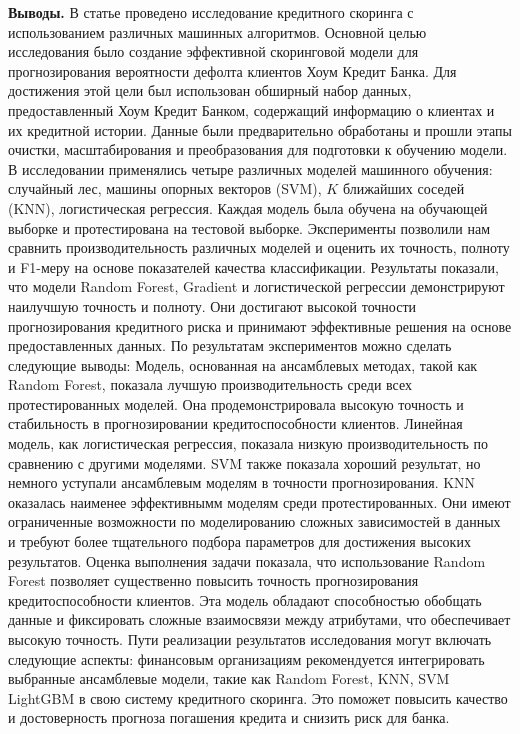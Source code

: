 {\bfseries Выводы.} В статье проведено исследование кредитного скоринга с
использованием различных машинных алгоритмов. Основной целью
исследования было создание эффективной скоринговой модели для
прогнозирования вероятности дефолта клиентов Хоум Кредит Банка. Для
достижения этой цели был использован обширный набор данных,
предоставленный Хоум Кредит Банком, содержащий информацию о клиентах и
\hspace{0pt}\hspace{0pt}их кредитной истории. Данные были предварительно
обработаны и прошли этапы очистки, масштабирования и преобразования для
подготовки к обучению модели. В исследовании применялись четыре
различных моделей машинного обучения: случайный лес, машины опорных
векторов (SVM), $K$ ближайших соседей
(KNN), логистическая регрессия. Каждая модель была обучена на обучающей
выборке и протестирована на тестовой выборке. Эксперименты позволили нам
сравнить производительность различных моделей и оценить их точность,
полноту и F1-меру на основе показателей качества классификации.
Результаты показали, что модели Random Forest, Gradient и логистической
регрессии демонстрируют наилучшую точность и полноту. Они достигают
высокой точности прогнозирования кредитного риска и принимают
эффективные решения на основе предоставленных данных. По результатам
экспериментов можно сделать следующие выводы: Модель, основанная на
ансамблевых методах, такой как Random Forest, показала лучшую
производительность среди всех протестированных моделей. Она
продемонстрировала высокую точность и стабильность в прогнозировании
кредитоспособности клиентов. Линейная модель, как логистическая
регрессия, показала низкую производительность по сравнению с другими
моделями. SVM также показала хороший результат, но немного уступали
ансамблевым моделям в точности прогнозирования. KNN оказалась наименее
эффективнымм моделям среди протестированных. Они имеют ограниченные
возможности по моделированию сложных зависимостей в данных и требуют
более тщательного подбора параметров для достижения высоких результатов.
Оценка выполнения задачи показала, что использование Random Forest
позволяет существенно повысить точность прогнозирования
кредитоспособности клиентов. Эта модель обладают способностью обобщать
данные и фиксировать сложные взаимосвязи между атрибутами, что
обеспечивает высокую точность. Пути реализации результатов исследования
могут включать следующие аспекты: финансовым организациям рекомендуется
интегрировать выбранные ансамблевые модели, такие как Random Forest,
KNN, SVM LightGBM в свою систему кредитного скоринга. Это поможет
повысить качество и достоверность прогноза погашения кредита и снизить
риск для банка.

